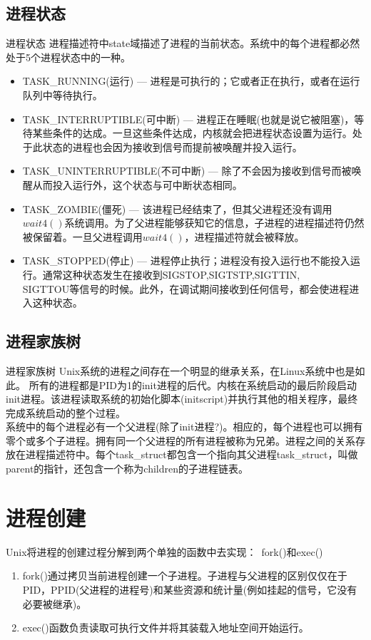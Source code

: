 \documentclass[10pt,compress,mathserif,red]{beamer}
\begin{document}
\begin{CJK*}{UTF8}{gkai}
\subsection{进程状态}
\begin{frame}{进程状态}
进程描述符中state域描述了进程的当前状态。系统中的每个进程都必然处于5个进程状态中的一种。\\
{\small
\begin{itemize}
	\item<2-> TASK\_RUNNING(运行) --- 进程是可执行的；它或者正在执行，或者在运行队列中等待执行。
	\item<3-> TASK\_INTERRUPTIBLE(可中断) --- 进程正在睡眠(也就是说它被阻塞)，等待某些条件的达成。一旦这些条件达成，内核就会把进程状态设置为运行。处于此状态的进程也会因为接收到信号而提前被唤醒并投入运行。
	\item<4-> TASK\_UNINTERRUPTIBLE(不可中断) --- 除了不会因为接收到信号而被唤醒从而投入运行外，这个状态与可中断状态相同。
	\item<5-> TASK\_ZOMBIE(僵死) --- 该进程已经结束了，但其父进程还没有调用$wait4()$系统调用。为了父进程能够获知它的信息，子进程的进程描述符仍然被保留着。一旦父进程调用$wait4()$，进程描述符就会被释放。
	\item<6-> TASK\_STOPPED(停止) --- 进程停止执行；进程没有投入运行也不能投入运行。通常这种状态发生在接收到SIGSTOP,SIGTSTP,SIGTTIN,\\SIGTTOU等信号的时候。此外，在调试期间接收到任何信号，都会使进程进入这种状态。
\end{itemize}}
\end{frame}
\subsection{进程家族树}
\begin{frame}{进程家族树}
Unix系统的进程之间存在一个明显的继承关系，在Linux系统中也是如此。{\color{red} 所有的进程都是PID为1的init进程的后代。内核在系统启动的最后阶段启动init进程。该进程读取系统的初始化脚本(initscript)并执行其他的相关程序，最终完成系统启动的整个过程。}\\
系统中的每个进程必有一个父进程(除了init进程?)。相应的，每个进程也可以拥有零个或多个子进程。拥有同一个父进程的所有进程被称为兄弟。进程之间的关系存放在进程描述符中。每个task\_struct都包含一个指向其父进程task\_struct，叫做parent的指针，还包含一个称为children的子进程链表。
\end{frame}
\section{进程创建}
\begin{frame}
Unix将进程的创建过程分解到两个单独的函数中去实现：\ fork()和exec()
\begin{block}{}
\begin{enumerate}
	\item<2-> fork()通过拷贝当前进程创建一个子进程。子进程与父进程的区别仅仅在于PID，PPID(父进程的进程号)和某些资源和统计量(例如挂起的信号，它没有必要被继承)。
	\item<3-> exec()函数负责读取可执行文件并将其装载入地址空间开始运行。
\end{enumerate}
\end{block}
\end{frame}

\end{CJK*}
\end{document}

